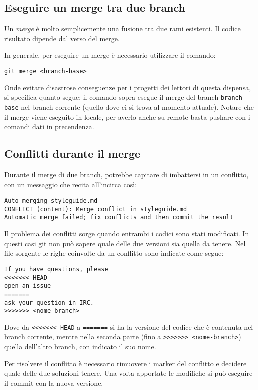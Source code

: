 \documentclass[a4paper, 11pt]{article}
\begin{document}
	\subsection{Eseguire un merge tra due branch}
	Un \emph{merge} è molto semplicemente una fusione tra due rami esistenti. Il codice risultato dipende dal verso del merge.
	
	In generale, per eseguire un merge è necessario utilizzare il comando: \begin{lstlisting}
git merge <branch-base>
	\end{lstlisting}
	Onde evitare disastrose conseguenze per i progetti dei lettori di questa dispensa, si specifica quanto segue: il comando sopra esegue il merge del branch \lstinline|branch-base| nel branch corrente (quello dove ci si trova al momento attuale). Notare che il merge viene eseguito in locale, per averlo anche su remote basta pushare con i comandi dati in precendenza.
	
	\subsection{Conflitti durante il merge}
	Durante il merge di due branch, potrebbe capitare di imbattersi in un conflitto, con un messaggio che recita all'incirca così:
	\begin{lstlisting}
Auto-merging styleguide.md
CONFLICT (content): Merge conflict in styleguide.md
Automatic merge failed; fix conflicts and then commit the result
	\end{lstlisting}
	
	Il problema dei conflitti sorge quando entrambi i codici sono stati modificati. In questi casi git non può sapere quale delle due versioni sia quella da tenere. Nel file sorgente le righe coinvolte da un conflitto sono indicate come segue:
	
	\begin{lstlisting}
If you have questions, please
<<<<<<< HEAD
open an issue
=======
ask your question in IRC.
>>>>>>> <nome-branch>
	\end{lstlisting}
	
	Dove da \lstinline|<<<<<<< HEAD| a \lstinline|=======| si ha la versione del codice che è contenuta nel branch corrente, mentre nella seconda parte (fino a \lstinline|>>>>>>> <nome-branch>|) quella dell'altro branch, con indicato il suo nome.
	
	Per risolvere il conflitto è necessario rimuovere i marker del conflitto e decidere quale delle due soluzioni tenere. Una volta apportate le modifiche si può eseguire il commit con la nuova versione.
	
\end{document}
